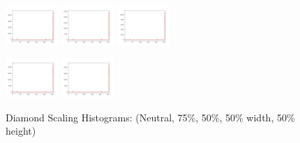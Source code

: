 \documentclass[conference]{IEEEtran}
\begin{document}
\begin{figure}[H]
    \centerline{
        {\includegraphics[width=20mm, scale=0.5]{./figures/ScalingHists/diamond.png}}
        {\includegraphics[width=20mm, scale=0.5]{./figures/ScalingHists/diamond75.png}}
        {\includegraphics[width=20mm, scale=0.5]{./figures/ScalingHists/diamond50.png}}
    }
    \centerline{
        {\includegraphics[width=20mm, scale=0.5]{./figures/ScalingHists/diamond50w.png}}
        {\includegraphics[width=20mm, scale=0.5]{./figures/ScalingHists/diamond50h.png}}
    }
    \caption{Diamond Scaling Histograms: (Neutral, 75\%, 50\%, 50\% width, 50\% height)}
    \label{fig}
\end{figure}
\end{document}

